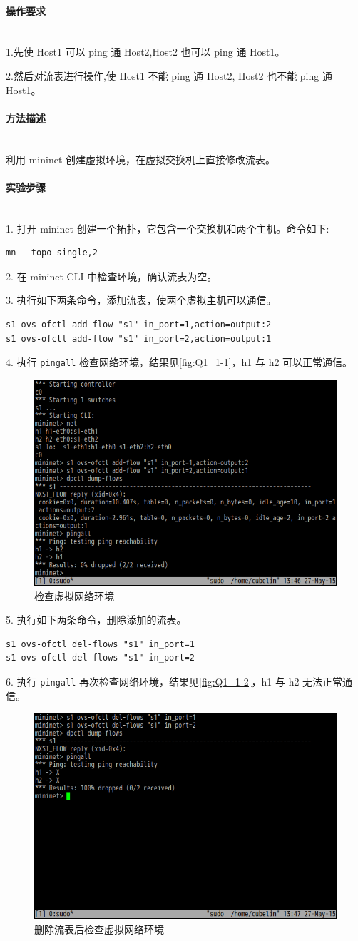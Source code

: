 \documentclass[format=draft,language=chinese,category=SDN]{hustreport}
\newcommand{\myparagraph}[1]{\paragraph{#1}\mbox{}\\}
\newcommand{\code}{\texttt}
\begin{document}
\myparagraph{操作要求}
1.先使 Host1 可以 ping 通 Host2,Host2 也可以 ping 通 Host1。

2.然后对流表进行操作,使 Host1 不能 ping 通 Host2, Host2 也不能 ping 通 Host1。

\myparagraph{方法描述}
利用 mininet 创建虚拟环境，在虚拟交换机上直接修改流表。

\myparagraph{实验步骤}
1. 打开 mininet 创建一个拓扑，它包含一个交换机和两个主机。命令如下:

\begin{lstlisting}
mn --topo single,2
\end{lstlisting}

2. 在 mininet CLI 中检查环境，确认流表为空。

3. 执行如下两条命令，添加流表，使两个虚拟主机可以通信。

\begin{lstlisting}
s1 ovs-ofctl add-flow "s1" in_port=1,action=output:2
s1 ovs-ofctl add-flow "s1" in_port=2,action=output:1
\end{lstlisting}

4. 执行 \code{pingall} 检查网络环境，结果见\autoref{fig:Q1_1-1}，h1 与 h2 可以正常通信。

\begin{figure}[!h]
\centering
\includegraphics[width=.618\textwidth]{fig/1_1-1.png}
\caption{检查虚拟网络环境}\label{fig:Q1_1-1}
\end{figure}

5. 执行如下两条命令，删除添加的流表。

\begin{lstlisting}
s1 ovs-ofctl del-flows "s1" in_port=1
s1 ovs-ofctl del-flows "s1" in_port=2
\end{lstlisting}

6. 执行 \code{pingall} 再次检查网络环境，结果见\autoref{fig:Q1_1-2}，h1 与 h2 无法正常通信。

\begin{figure}[!h]
\centering
\includegraphics[width=.618\textwidth]{fig/1_1-2.png}
\caption{删除流表后检查虚拟网络环境}\label{fig:Q1_1-2}
\end{figure}
\end{document}
